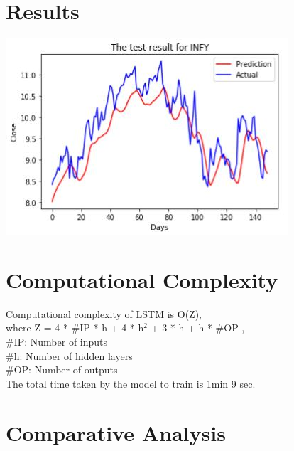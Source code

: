 \section{Results}


				\begin{center}
				\includegraphics[width=\linewidth]{figures/test-data-results.jpg}	
				\label{fig: Plot showing of Actual and Predicted values}
				\end{center}

\section{Computational Complexity}

Computational complexity of LSTM is O(Z),\\
  where Z = 4 * \#IP * h + 4 * h$^{2}$ + 3 * h + h * \#OP , \\
 \tab\#IP: Number of inputs\\
 \tab\#h: Number of hidden layers\\
 \tab\#OP: Number of outputs\\

The total time taken by the model to train is 1min 9 sec.
\section{Comparative Analysis} 

